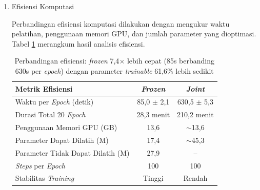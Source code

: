 \documentclass[12pt,a4paper]{article}
\begin{document}
\begin{enumerate}[leftmargin=1.5em, labelsep=0.5em, itemindent=0pt, noitemsep, topsep=0pt, label=\arabic*., leftmargin=0.8cm]
          

    \item Efisiensi Komputasi

          Perbandingan efisiensi komputasi dilakukan dengan mengukur waktu pelatihan, penggunaan memori GPU, dan jumlah parameter yang dioptimasi. Tabel \ref{tab:frozen-vs-joint-efficiency} merangkum hasil analisis efisiensi.

          \begin{table}[!htbp]
              \caption[Efisiensi komputasi frozen berbanding joint]{Perbandingan efisiensi: \textit{frozen} 7,4$\times$ lebih cepat (85s berbanding 630s per \textit{epoch}) dengan parameter \textit{trainable} 61,6\% lebih sedikit}
              \label{tab:frozen-vs-joint-efficiency}
              \begin{tabularx}{\textwidth}{|>{\raggedright\arraybackslash}X|c|c|}
                  \toprule
                  \textbf{Metrik Efisiensi}                     & \textbf{\textit{Frozen}}         & \textbf{\textit{Joint}}           \\
                  \midrule
                  Waktu per \textit{Epoch} (detik)     & 85,0 $\pm$ 2,1 & 630,5 $\pm$ 5,3 \\
                  Durasi Total 20 \textit{Epoch}       & 28,3 menit     & 210,2 menit     \\
                  Penggunaan Memori GPU (GB)           & 13,6           & $\sim$13,6      \\
                  Parameter Dapat Dilatih (M)     & 17,4           & $\sim$45,3      \\
                  Parameter Tidak Dapat Dilatih (M) & 27,9           & --             \\
                  \textit{Steps} per \textit{Epoch}    & 100            & 100             \\
                  Stabilitas \textit{Training}         & Tinggi         & Rendah          \\
                  \bottomrule
              \end{tabularx}
          \end{table}


\end{enumerate}
\end{document}

